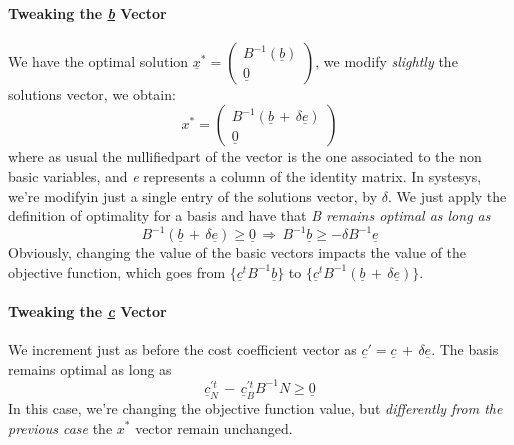 				\paragraph{Tweaking the \emph{\underline{b}} Vector}
					We have the optimal solution $\underline{x}^* = \begin{pmatrix} B^{-1}(\underline{b}) \\ \underline{0} \end{pmatrix}$, we modify \emph{slightly} the solutions vector, we obtain:
					\begin{equation}
						x^* = 
						\begin{pmatrix}
							B^{-1} ( \underline{b}\, +\, \delta \underline{e} ) \\
							\underline{0}
						\end{pmatrix}
					\end{equation}
					where as usual the nullifiedpart of the vector is the one associated to the non basic variables, and \emph{e} represents a column of the identity matrix. In systesys, we're modifyin just a single entry of the solutions vector, by $\delta$. We just apply the definition of optimality for a basis and have that \textit{B remains optimal as long as}
					\begin{equation}
						B^{-1} ( \underline{b}\, +\, \delta \underline{e} ) \geq \underline{0} \,\Rightarrow\, B^{-1}\underline{b} \geq -\delta B^{-1} \underline{e}
					\end{equation}
					Obviously, changing the value of the basic vectors impacts the value of the objective function, which goes from $\{\underline{c}^tB^{-1}\underline{b}\}$ to $\{ \underline{c}^tB^{-1} ( \underline{b}\, +\, \delta \underline{e} ) \}$.

				\paragraph{Tweaking the \emph{\underline{c}} Vector}
					We increment just as before the cost coefficient vector as $\underline{c}' = \underline{c}\, +\, \delta \underline{e}$. The basis remains optimal as long as
					\begin{equation}
						\underline{c}_N^{'t}\, -\, \underline{c}_B^{'t}B^{-1}N \geq \underline{0}
					\end{equation}
					In this case, we're changing the objective function value, but \textit{differently from the previous case} the $x^*$ vector remain unchanged.
